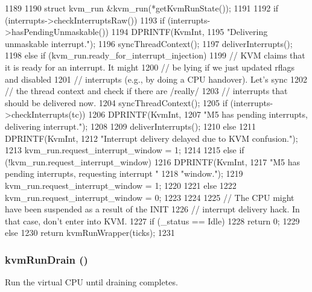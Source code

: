 \begin{DoxyCode}
1189 {
1190     struct kvm_run &kvm_run(*getKvmRunState());
1191 
1192     if (interrupts->checkInterruptsRaw()) {
1193         if (interrupts->hasPendingUnmaskable()) {
1194             DPRINTF(KvmInt,
1195                     "Delivering unmaskable interrupt.\n");
1196             syncThreadContext();
1197             deliverInterrupts();
1198         } else if (kvm_run.ready_for_interrupt_injection) {
1199             // KVM claims that it is ready for an interrupt. It might
1200             // be lying if we just updated rflags and disabled
1201             // interrupts (e.g., by doing a CPU handover). Let's sync
1202             // the thread context and check if there are /really/
1203             // interrupts that should be delivered now.
1204             syncThreadContext();
1205             if (interrupts->checkInterrupts(tc)) {
1206                 DPRINTF(KvmInt,
1207                         "M5 has pending interrupts, delivering interrupt.\n");
1208 
1209                 deliverInterrupts();
1210             } else {
1211                 DPRINTF(KvmInt,
1212                         "Interrupt delivery delayed due to KVM confusion.\n");
1213                 kvm_run.request_interrupt_window = 1;
1214             }
1215         } else if (!kvm_run.request_interrupt_window) {
1216             DPRINTF(KvmInt,
1217                     "M5 has pending interrupts, requesting interrupt "
1218                     "window.\n");
1219             kvm_run.request_interrupt_window = 1;
1220         }
1221     } else {
1222         kvm_run.request_interrupt_window = 0;
1223     }
1224 
1225     // The CPU might have been suspended as a result of the INIT
1226     // interrupt delivery hack. In that case, don't enter into KVM.
1227     if (_status == Idle)
1228         return 0;
1229     else
1230         return kvmRunWrapper(ticks);
1231 }
\end{DoxyCode}
\hypertarget{classX86KvmCPU_a405afc17ad0dee3b816012ce909b2b6f}{
\subsubsection[{kvmRunDrain}]{ kvmRunDrain ()}}
\label{classX86KvmCPU_a405afc17ad0dee3b816012ce909b2b6f}
Run the virtual CPU until draining completes.


